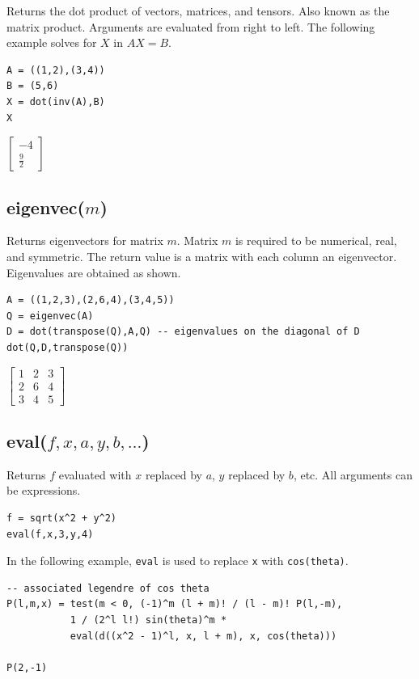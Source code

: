 \documentclass[12pt]{article}
\begin{document}
Returns the dot product of vectors, matrices, and tensors.
Also known as the matrix product.
Arguments are evaluated from right to left.
The following example solves for $X$ in $AX=B$.

{\color{blue}
\begin{verbatim}
A = ((1,2),(3,4))
B = (5,6)
X = dot(inv(A),B)
X
\end{verbatim}
}

\noindent
$\displaystyle
\begin{bmatrix}
-4
\\[1ex]
\tfrac{9}{2}
\end{bmatrix}
$

\subsection*{eigenvec($m$)}

Returns eigenvectors for matrix $m$.
Matrix $m$ is required to be numerical, real, and symmetric.
The return value is a matrix with each column an eigenvector.
Eigenvalues are obtained as shown.

{\color{blue}
\begin{verbatim}
A = ((1,2,3),(2,6,4),(3,4,5))
Q = eigenvec(A)
D = dot(transpose(Q),A,Q) -- eigenvalues on the diagonal of D
dot(Q,D,transpose(Q))
\end{verbatim}
}

\noindent
$\displaystyle
\begin{bmatrix}
1 & 2 & 3
\\[1ex]
2 & 6 & 4
\\[1ex]
3 & 4 & 5
\end{bmatrix}
$

\subsection*{eval($f,x,a,y,b,\ldots$)}

Returns $f$ evaluated with $x$ replaced by $a$, $y$ replaced by $b$, etc.
All arguments can be expressions.

{\color{blue}
\begin{verbatim}
f = sqrt(x^2 + y^2)
eval(f,x,3,y,4)
\end{verbatim}
}


\bigskip
\noindent
In the following example, \verb$eval$ is used to replace
\verb$x$ with \verb$cos(theta)$.

{\color{blue}
\begin{verbatim}
-- associated legendre of cos theta
P(l,m,x) = test(m < 0, (-1)^m (l + m)! / (l - m)! P(l,-m),
           1 / (2^l l!) sin(theta)^m *
           eval(d((x^2 - 1)^l, x, l + m), x, cos(theta)))

P(2,-1)
\end{verbatim}
}
\end{document}
